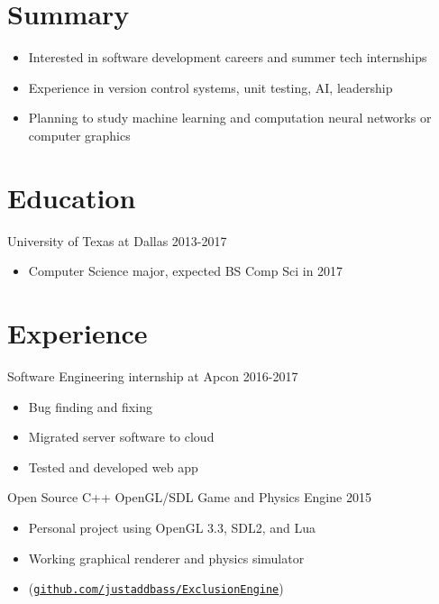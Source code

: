 \documentclass[line,margin]{res}
\begin{document}
	\address{3000 Northside Blvd \#1332, Richardson, TX 75080}
	\address{(512)574-6609 |
	\href{mailto:rxb132330@utdallas.edu}{rxb132330@utdallas.edu}}

\begin{resume}

\vspace{8pt}
\section{Summary}
\vspace{22pt}
	\begin{itemize} \itemsep -2pt
	\item Interested in software development careers and summer tech internships
	\item Experience in version control systems, unit testing, AI, leadership
	\item Planning to study machine learning and computation neural networks or computer graphics
	\end{itemize}

\vspace{8pt}
\section{Education}
\vspace{12pt}
University of Texas at Dallas \hfill 2013-2017 \\
\vspace{-12pt}
	\begin{itemize} \itemsep -2pt
	\item Computer Science major, expected BS Comp Sci in 2017
	\end{itemize}

\vspace{8pt}
\section{Experience}
\vspace{12pt}
Software Engineering internship at Apcon
\hfill 2016-2017
	\begin{itemize} \itemsep -2pt
	\item Bug finding and fixing
	\item Migrated server software to cloud
	\item Tested and developed web app
	\end{itemize}

\vspace{6pt}
Open Source C++ OpenGL/SDL Game and Physics Engine
\hfill 2015
	\begin{itemize} \itemsep -2pt
	\item Personal project using OpenGL 3.3, SDL2, and Lua
	\item Working graphical renderer and physics simulator
	\item (\href{https://github.com/justaddbass/ExclusionEngine}{\texttt{github.com/justaddbass/ExclusionEngine}})
	\end{itemize}


\end{resume}
\end{document}
